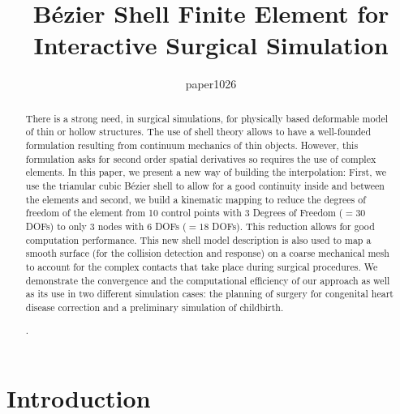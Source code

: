 \documentclass{egpubl}
\title[B\'ezier Shell FE]%
      {B\'ezier Shell Finite Element for Interactive Surgical Simulation}
\author[paper1026]
              {paper1026}
\begin{document}

\maketitle

\begin{abstract}
There is a strong need, in surgical simulations, for physically based deformable model of thin or hollow structures.
The use of shell theory allows to have a well-founded formulation resulting from continuum mechanics of thin objects.
However, this formulation asks for second order spatial derivatives so requires the use of complex elements.
In this paper, we present a new way of building the interpolation:
First, we use the trianular cubic B\'ezier shell to allow for a good continuity inside and between the elements and second, we build a kinematic mapping to reduce the degrees of freedom of the element from 10 control points with 3 Degrees of Freedom ($=30$ DOFs) to only 3 nodes with 6 DOFs ($=18$ DOFs).
This reduction allows for good computation performance.
This new shell model description is also used to map a smooth surface (for the collision detection and response) on a coarse mechanical mesh to account for the complex contacts that take place during surgical procedures.
We demonstrate the convergence and the computational efficiency of our approach as well as its use in two different simulation cases: the planning of surgery for congenital heart disease correction and a preliminary simulation of childbirth.

\begin{classification} %
    .
\end{classification}

\end{abstract}






\section{Introduction} %
\end{document}
